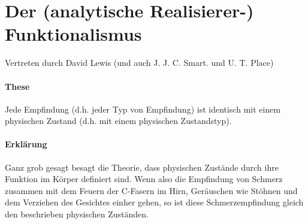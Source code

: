\documentclass[../main.tex]{subfiles}
\begin{document}
\section{Der (analytische Realisierer-) Funktionalismus}  
Vertreten durch David Lewis (und auch J. J. C. Smart. und U. T. Place)
\paragraph{These} Jede Empfindung (d.h. jeder Typ von Empfindung) ist identisch mit einem physischen Zustand (d.h. mit einem physischen Zustandstyp).
\paragraph{Erklärung} Ganz grob gesagt besagt die Theorie, dass physischen Zustände durch ihre Funktion im Körper definiert sind. Wenn also die Empfindung von Schmerz zusammen mit dem Feuern der C-Fasern im Hirn, Geräuschen wie Stöhnen und dem Verziehen des Gesichtes einher gehen, so ist diese Schmerzempfindung gleich den beschrieben physischen Zuständen. 
\end{document}
